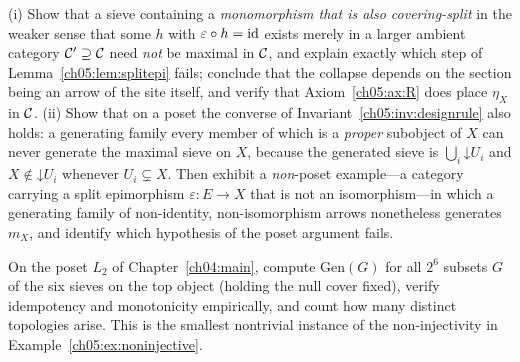 \begin{exercise}\label{ch05:exr:variants}
(i) Show that a sieve containing a \emph{monomorphism that is also
covering-split} in the weaker sense that some $h$ with
$\varepsilon\circ h=\mathrm{id}$ exists merely in a larger ambient category
$\mathcal{C}'\supseteq\mathcal{C}$ need \emph{not} be maximal in $\mathcal{C}$, and explain exactly
which step of Lemma~\ref{ch05:lem:splitepi} fails; conclude that the
collapse depends on the section being an arrow of the site itself, and
verify that Axiom~\ref{ch05:ax:R} does place $\eta_X$ in $\mathcal{C}$.
(ii) Show that on a poset the converse of
Invariant~\ref{ch05:inv:designrule} also holds: a generating family every
member of which is a \emph{proper} subobject of $X$ can never generate the
maximal sieve on $X$, because the generated sieve is
$\bigcup_i\mathord{\downarrow}U_i$ and $X\notin\mathord{\downarrow}U_i$
whenever $U_i\subsetneq X$. Then exhibit a \emph{non}-poset
example---a category carrying a split epimorphism $\varepsilon:E\to X$ that
is not an isomorphism---in which a generating family of non-identity,
non-isomorphism arrows nonetheless generates $m_X$, and identify which
hypothesis of the poset argument fails.
\end{exercise}

\begin{exercise}\label{ch05:exr:closurecount}
On the poset $L_2$ of Chapter~\ref{ch04:main}, compute
$\mathrm{Gen}(G)$ for all $2^{6}$ subsets $G$ of the six sieves on the top
object (holding the null cover fixed), verify idempotency and monotonicity
empirically, and count how many distinct topologies arise. This is the
smallest nontrivial instance of the non-injectivity in
Example~\ref{ch05:ex:noninjective}.
\end{exercise}
